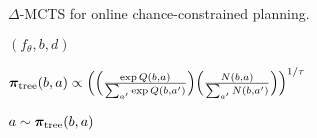 \begin{algorithm}[H]
    \caption{$\Delta$-MCTS for online chance-constrained planning.}
    \label{alg:delta-mcts}
    \begin{algorithmic}[1]
        \State {} 
            \State {}$(f_\theta,b,d)$
        \EndFor

        \State $\boldsymbol\pi_\text{tree}(b, a) \propto \Big( \Big(\frac{\exp Q(b,a)}{\sum_{a'} \exp Q(b,a')}\Big) \Big(\frac{N(b,a)}{\sum_{a'} N(b,a')}\Big) \Big)^{1/\tau}$ 
    
        \State \Return $a \sim \boldsymbol\pi_\text{tree}(b, a)\phantom{\big)}$ 
        \State \phantom{\Return} \!  \label{line:root_constraint}
    \EndFunction
    \end{algorithmic}
\end{algorithm}
